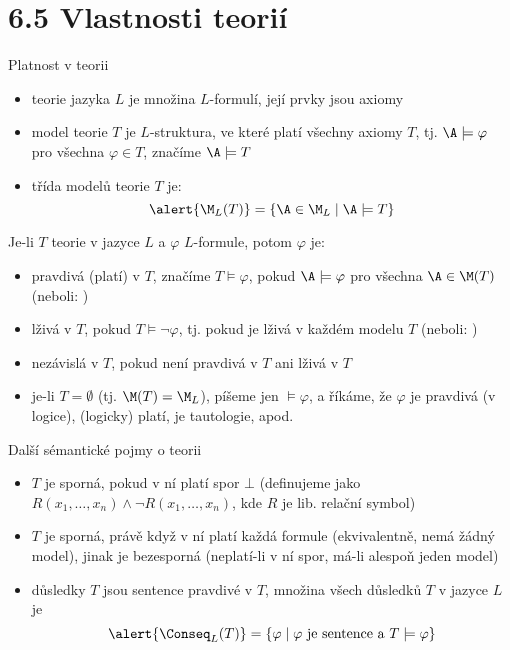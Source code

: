 \documentclass{beamer}
\begin{document}
\section{6.5 Vlastnosti teorií}


\begin{frame}{Platnost v teorii}

    \begin{itemize}
        \item \alert{teorie} jazyka $L$ je množina $L$-formulí, její prvky jsou \alert{axiomy}\pause
        \item \alert{model} teorie $T$ je $L$-struktura, ve které platí všechny axiomy $T$, tj. $\A\models\varphi$ pro všechna $\varphi\in T$, značíme $\A\models T$\pause
        \item \alert{třída modelů} teorie $T$ je:
        $$
        \alert{\M_L(T)}=\{\A\in\M_L\mid\A\models T\}
        $$
    \end{itemize}
    
    \pause
    Je-li $T$ teorie v jazyce $L$ a $\varphi$ $L$-formule, potom $\varphi$ je:\pause
    \begin{itemize}
        \item \alert{pravdivá (platí) v $T$}, značíme \alert{$T\models\varphi$}, pokud $\A\models\varphi$ pro všechna $\A\in\M(T)$ (neboli: )\pause
        \item \alert{lživá v $T$}, pokud $T\models\neg\varphi$, tj. pokud je lživá v každém modelu $T$ (neboli: )\pause
        \item \alert{nezávislá v $T$}, pokud není pravdivá v $T$ ani lživá v $T$\pause
        \item je-li $T=\emptyset$ (tj. $\M(T)=\M_L$), píšeme jen \alert{$\models\varphi$}, a říkáme, že $\varphi$ \alert{je pravdivá (v logice), (logicky) platí, je tautologie}, apod.
    \end{itemize}
    
\end{frame}


\begin{frame}{Další sémantické pojmy o teorii}
    
    \begin{itemize}
        \item $T$ je \alert{sporná}, pokud v ní platí \alert{spor} $\bot$ (definujeme jako $R(x_1,\dots,x_n)\land \neg R(x_1,\dots,x_n)$, kde $R$ je lib. relační symbol)\pause
        \item $T$ je sporná, právě když v ní platí každá formule (ekvivalentně, nemá žádný model), jinak je \alert{bezesporná} (neplatí-li v ní spor, má-li alespoň jeden model)\pause
        \item \alert{důsledky} $T$ jsou \alert{sentence} pravdivé v $T$, množina všech důsledků $T$ v jazyce $L$ je
        $$
        \alert{\Conseq_L(T)}=\{\varphi\mid\text{$\varphi$ je sentence a }T\models \varphi\}
        $$
    \end{itemize}

\end{frame}
\end{document}
